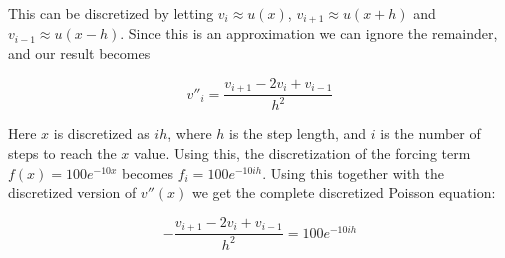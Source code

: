 \documentclass[english,notitlepage]{revtex4-1}  %
\begin{document}
This can be discretized by letting $v_i \approx u(x)$, $v_{i+1} \approx u(x+h)$
and $v_{i-1} \approx u(x-h)$. Since this is an approximation we can ignore the
remainder, and our result becomes

\begin{equation*}
    v''_i = \frac{v_{i+1} - 2v_i + v_{i-1}}{h^2}
\end{equation*}

Here $x$ is discretized as $i h$, where $h$ is the step length, and $i$ is the
number of steps to reach the $x$ value. Using this, the discretization of the
forcing term $f(x) = 100 e^{-10 x}$ becomes $f_i = 100 e^{-10 ih}$. Using this
together with the discretized version of $v''(x)$ we get the complete
discretized Poisson equation:

\begin{equation}
    -\frac{v_{i+1} - 2v_i + v_{i-1}}{h^2} = 100 e^{-10 i h}
\end{equation}
\end{document}
